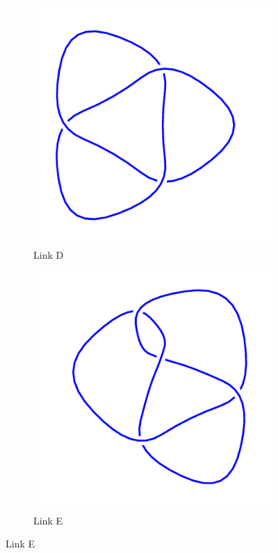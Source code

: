 \documentclass[12pt,letterpaper]{article}
\theoremstyle{definition}
\begin{document}
\begin{figure}[h!]
    \begin{subfigure}{.4\textwidth}
        \centering
        \includegraphics[width=\textwidth]{rgp08pics/3_1mirror.png}
        \caption{Link D}
    \end{subfigure}
    \hspace{.5cm}
    \begin{subfigure}{.4\textwidth}
        \centering
        \includegraphics[width=\textwidth]{meeting09pics/4_1.png}
        \caption{Link E}
    \end{subfigure}
    

\end{figure}
\end{document}

